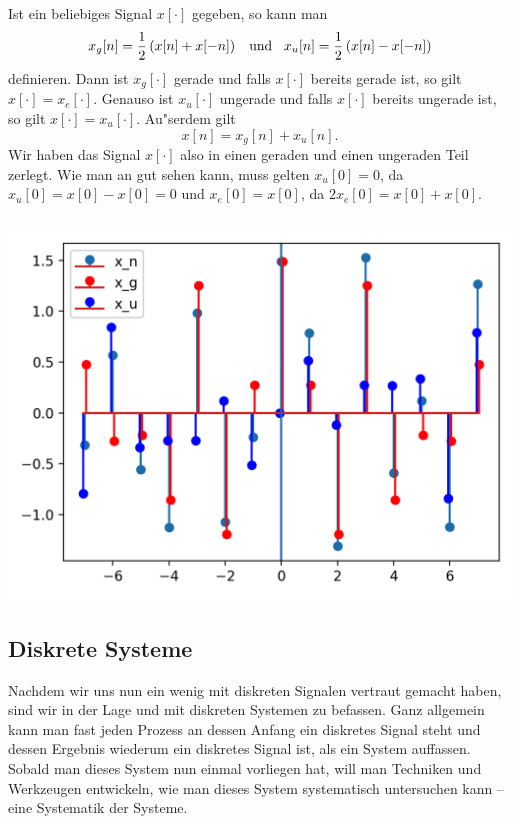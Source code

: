 Ist ein beliebiges Signal $x[\cdot]$ gegeben, so kann man
\[
    x_g[n] = \frac 12 \left(x[n] + x[-n]\right)
    {\hspace{3mm} \text{und} \hspace{3mm}}
    x_u[n] = \frac 12 \left(x[n] - x[-n]\right)
\]
definieren.
Dann ist $x_g[\cdot]$ gerade und falls $x[\cdot]$ bereits gerade ist, so gilt $x[\cdot] = x_e[\cdot]$.
Genauso ist $x_u[\cdot]$ ungerade und falls $x[\cdot]$ bereits ungerade ist, so gilt $x[\cdot] = x_u[\cdot]$.
Au"serdem gilt
\[
x[n] = x_g[n] + x_u[n].
\]
Wir haben das Signal $x[\cdot]$ also in einen geraden und einen ungeraden Teil zerlegt.
Wie man an  gut sehen kann, muss gelten $x_u[0] =0$, da $x_u[0] = x[0] - x[0] = 0$ und $x_e[0] = x[0]$, da $2 x_e[0] = x[0] + x[0]$.
%
\begin{listing}
    \noindent
    \begin{minipage}{0.49\textwidth}
        \strut\vspace*{-\baselineskip}\newline
        \inputminted[firstline=4]{python3}{code/even_odd.py}
    \end{minipage}%
    \begin{minipage}{0.49\textwidth}
        \strut\vspace*{-\baselineskip}\newline
        \includegraphics[width=\textwidth]{code/even_odd.png}
    \end{minipage}
    \label{py:even_odd}
\end{listing}
%
\subsection{Diskrete Systeme}
%
%
Nachdem wir uns nun ein wenig mit diskreten Signalen vertraut gemacht haben, sind wir in der Lage und mit diskreten Systemen zu befassen.
Ganz allgemein kann man fast jeden Prozess an dessen Anfang ein diskretes Signal steht und dessen Ergebnis wiederum ein diskretes Signal ist, als ein System auffassen.
Sobald man dieses System nun einmal vorliegen hat, will man Techniken und Werkzeugen entwickeln, wie man dieses System systematisch untersuchen kann -- eine Systematik der Systeme.

